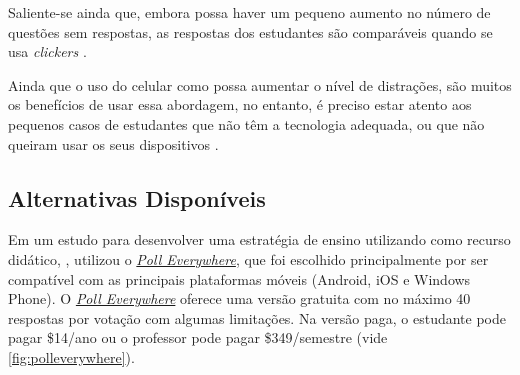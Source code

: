 Saliente-se ainda que, embora possa haver um pequeno aumento no número de questões
sem respostas, as respostas dos estudantes são comparáveis quando se usa
\textit{clickers} \cite{Morrell2015, Stowell2015}.

Ainda que o uso do celular como {\clicker} possa aumentar o nível de
distrações, são muitos os benefícios de usar essa abordagem, no entanto,
é preciso estar atento aos pequenos casos de estudantes que não têm a tecnologia
adequada, ou que não queiram usar os seus dispositivos \cite{Morrell2015, Stowell2015}.

%

\subsection{Alternativas Disponíveis}
\label{subp:alternativas_disponiveis}

Em um estudo para desenvolver uma estratégia de ensino utilizando
{\clickers} como recurso didático, , utilizou o
\href{https://www.polleverywhere.com/}{\textit{Poll Everywhere}}, que foi
escolhido principalmente por ser compatível com as principais plataformas
móveis (Android, iOS e Windows Phone). O
\href{https://www.polleverywhere.com/}{\textit{Poll Everywhere}} oferece uma
versão gratuita com no máximo 40 respostas por votação com algumas limitações.
Na versão paga, o estudante pode pagar \$14/ano ou o professor pode pagar
\$349/semestre (vide \autoref{fig:polleverywhere}).

